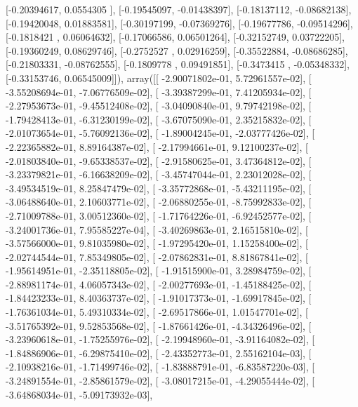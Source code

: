 \documentclass{article}
\begin{document}
       [-0.20394617,  0.0554305 ],
       [-0.19545097, -0.01438397],
       [-0.18137112, -0.08682138],
       [-0.19420048,  0.01883581],
       [-0.30197199, -0.07369276],
       [-0.19677786, -0.09514296],
       [-0.1818421 ,  0.06064632],
       [-0.17066586,  0.06501264],
       [-0.32152749,  0.03722205],
       [-0.19360249,  0.08629746],
       [-0.2752527 ,  0.02916259],
       [-0.35522884, -0.08686285],
       [-0.21803331, -0.08762555],
       [-0.1809778 ,  0.09491851],
       [-0.3473415 , -0.05348332],
       [-0.33153746,  0.06545009]]), array([[ -2.90071802e-01,   5.72961557e-02],
       [ -3.55208694e-01,  -7.06776509e-02],
       [ -3.39387299e-01,   7.41205934e-02],
       [ -2.27953673e-01,  -9.45512408e-02],
       [ -3.04090840e-01,   9.79742198e-02],
       [ -1.79428413e-01,  -6.31230199e-02],
       [ -3.67075090e-01,   2.35215832e-02],
       [ -2.01073654e-01,  -5.76092136e-02],
       [ -1.89004245e-01,  -2.03777426e-02],
       [ -2.22365882e-01,   8.89164387e-02],
       [ -2.17994661e-01,   9.12100237e-02],
       [ -2.01803840e-01,  -9.65338537e-02],
       [ -2.91580625e-01,   3.47364812e-02],
       [ -3.23379821e-01,  -6.16638209e-02],
       [ -3.45747044e-01,   2.23012028e-02],
       [ -3.49534519e-01,   8.25847479e-02],
       [ -3.35772868e-01,  -5.43211195e-02],
       [ -3.06488640e-01,   2.10603771e-02],
       [ -2.06880255e-01,  -8.75992833e-02],
       [ -2.71009788e-01,   3.00512360e-02],
       [ -1.71764226e-01,  -6.92452577e-02],
       [ -3.24001736e-01,   7.95585227e-04],
       [ -3.40269863e-01,   2.16515810e-02],
       [ -3.57566000e-01,   9.81035980e-02],
       [ -1.97295420e-01,   1.15258400e-02],
       [ -2.02744544e-01,   7.85349805e-02],
       [ -2.07862831e-01,   8.81867841e-02],
       [ -1.95614951e-01,  -2.35118805e-02],
       [ -1.91515900e-01,   3.28984759e-02],
       [ -2.88981174e-01,   4.06057343e-02],
       [ -2.00277693e-01,  -1.45188425e-02],
       [ -1.84423233e-01,   8.40363737e-02],
       [ -1.91017373e-01,  -1.69917845e-02],
       [ -1.76361034e-01,   5.49310334e-02],
       [ -2.69517866e-01,   1.01547701e-02],
       [ -3.51765392e-01,   9.52853568e-02],
       [ -1.87661426e-01,  -4.34326496e-02],
       [ -3.23960618e-01,  -1.75255976e-02],
       [ -2.19948960e-01,  -3.91164082e-02],
       [ -1.84886906e-01,  -6.29875410e-02],
       [ -2.43352773e-01,   2.55162104e-03],
       [ -2.10938216e-01,  -1.71499746e-02],
       [ -1.83888791e-01,  -6.83587220e-03],
       [ -3.24891554e-01,  -2.85861579e-02],
       [ -3.08017215e-01,  -4.29055444e-02],
       [ -3.64868034e-01,  -5.09173932e-03],
\end{document}
